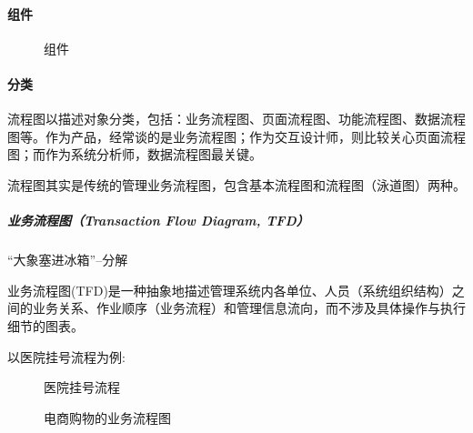 \documentclass[letterpaper,10pt,english]{sphinxmanual}
\begin{document}
\paragraph{组件}
\label{\detokenize{chapter_knowledge/flow_chart:id7}}
\begin{figure}[H]
\centering
\capstart

\noindent{}
\caption{组件}\label{\detokenize{chapter_knowledge/flow_chart:id37}}\end{figure}


\paragraph{分类}
\label{\detokenize{chapter_knowledge/flow_chart:id8}}
流程图以描述对象分类，包括：业务流程图、页面流程图、功能流程图、数据流程图等。作为产品，经常谈的是业务流程图；作为交互设计师，则比较关心页面流程图；而作为系统分析师，数据流程图最关键。
%
\begin{footnote}[583]\sphinxAtStartFootnote
{}
%
\end{footnote}

流程图其实是传统的管理业务流程图，包含基本流程图和流程图（泳道图）两种。


\subparagraph{业务流程图（Transaction Flow Diagram, TFD）}
\label{\detokenize{chapter_knowledge/flow_chart:transaction-flow-diagram-tfd}}
“大象塞进冰箱”–分解

业务流程图(TFD)是一种抽象地描述管理系统内各单位、人员（系统组织结构）之间的业务关系、作业顺序（业务流程）和管理信息流向，而不涉及具体操作与执行细节的图表。

以医院挂号流程为例:

\begin{figure}[H]
\centering
\capstart

\noindent{}
\caption{医院挂号流程}\label{\detokenize{chapter_knowledge/flow_chart:id38}}\end{figure}

\begin{figure}[H]
\centering
\capstart

\noindent{}
\caption{电商购物的业务流程图}\label{\detokenize{chapter_knowledge/flow_chart:id39}}\label{\detokenize{chapter_knowledge/flow_chart:flow-chart-axure}}\end{figure}
\end{document}
